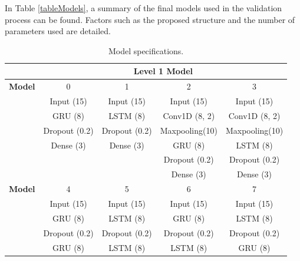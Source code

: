 In Table \ref{tableModels}, a summary of the final models used in the validation process can be found. Factors such as the proposed structure and the number of parameters used are detailed.

\begin{table}[htbp]
  \centering
  \caption{Model specifications.}
    \begin{tabular}{r|cccccccc}
          & \multicolumn{8}{c}{Level 1 Model} \\
    \midrule
    \textbf{Model} & \multicolumn{2}{c}{0} & \multicolumn{2}{c}{1} & \multicolumn{2}{c}{2} & \multicolumn{2}{c}{3} \\
    \midrule
          & \multicolumn{2}{c}{Input (15)} & \multicolumn{2}{c}{Input (15)} & \multicolumn{2}{c}{Input (15)} & \multicolumn{2}{c}{Input (15)} \\
          & \multicolumn{2}{c}{GRU (8)} & \multicolumn{2}{c}{LSTM (8)} & \multicolumn{2}{c}{Conv1D (8, 2)} & \multicolumn{2}{c}{Conv1D (8, 2)} \\
          & \multicolumn{2}{c}{Dropout (0.2)} & \multicolumn{2}{c}{Dropout (0.2)} & \multicolumn{2}{c}{Maxpooling(10)} & \multicolumn{2}{c}{Maxpooling(10)} \\
          & \multicolumn{2}{c}{Dense (3)} & \multicolumn{2}{c}{Dense (3)} & \multicolumn{2}{c}{GRU (8)} & \multicolumn{2}{c}{LSTM (8)} \\
          & \multicolumn{2}{c}{} & \multicolumn{2}{c}{} & \multicolumn{2}{c}{Dropout (0.2)} & \multicolumn{2}{c}{Dropout (0.2)} \\
          & \multicolumn{2}{c}{} & \multicolumn{2}{c}{} & \multicolumn{2}{c}{Dense (3)} & \multicolumn{2}{c}{Dense (3)} \\
    \midrule
    \textbf{Model} & \multicolumn{2}{c}{4} & \multicolumn{2}{c}{5} & \multicolumn{2}{c}{6} & \multicolumn{2}{c}{7} \\
    \midrule
          & \multicolumn{2}{c}{Input (15)} & \multicolumn{2}{c}{Input (15)} & \multicolumn{2}{c}{Input (15)} & \multicolumn{2}{c}{Input (15)} \\
          & \multicolumn{2}{c}{GRU (8)} & \multicolumn{2}{c}{LSTM (8)} & \multicolumn{2}{c}{GRU (8)} & \multicolumn{2}{c}{LSTM (8)} \\
          & \multicolumn{2}{c}{Dropout (0.2)} & \multicolumn{2}{c}{Dropout (0.2)} & \multicolumn{2}{c}{Dropout (0.2)} & \multicolumn{2}{c}{Dropout (0.2)} \\
          & \multicolumn{2}{c}{GRU (8)} & \multicolumn{2}{c}{LSTM (8)} & \multicolumn{2}{c}{LSTM (8)} & \multicolumn{2}{c}{GRU (8)} \\

\end{tabular}
\end{table}
